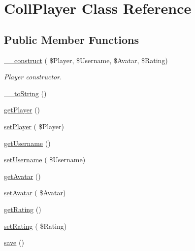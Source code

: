 \hypertarget{class_coll_player}{}\section{Coll\+Player Class Reference}
\label{class_coll_player}
\subsection*{Public Member Functions}
\begin{DoxyCompactItemize}
\item 
\hyperlink{class_coll_player_abe530dd0f355899d5115de676ff3067a}{\+\_\+\+\_\+construct} ( \$Player, \$Username, \$Avatar, \$Rating)
\begin{DoxyCompactList}\small\item\em Player constructor. \end{DoxyCompactList}\item 
\hyperlink{class_coll_player_ad8be65fd47e5e2f32b0d6b4834bbb8d4}{\+\_\+\+\_\+to\+String} ()
\item 
\hyperlink{class_coll_player_a6c05afc4eee3d39d1470147e13996bf5}{get\+Player} ()
\item 
\hyperlink{class_coll_player_a30f2d614484249893f9e45e9de86219a}{set\+Player} ( \$Player)
\item 
\hyperlink{class_coll_player_a7042b221470f22c2be46d97527585246}{get\+Username} ()
\item 
\hyperlink{class_coll_player_a2848a91c61798540abd64d4a5bb6d249}{set\+Username} ( \$Username)
\item 
\hyperlink{class_coll_player_a637eb922e5ca9cc7910627b889291323}{get\+Avatar} ()
\item 
\hyperlink{class_coll_player_a0e7661e5d52c9ea11fd8f60841b5a12f}{set\+Avatar} ( \$Avatar)
\item 
\hyperlink{class_coll_player_a59a6c6d2f1191c84f0c4f1cf227fb691}{get\+Rating} ()
\item 
\hyperlink{class_coll_player_ad6d077fde4f5a4600ab2a21063ab5c0c}{set\+Rating} ( \$Rating)
\item 
\hyperlink{class_coll_player_ad2c746b4ddcc6a6bd72b50f03e27d803}{save} ()
\end{DoxyCompactItemize}
